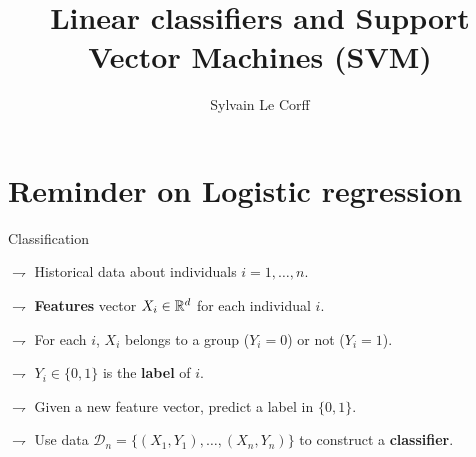 \documentclass[xcolor={usenames,dvipsnames}]{beamer}
\begin{document}
\title[]{Linear classifiers and Support Vector Machines (SVM)}
\author[S.~Le Corff]{Sylvain Le Corff}
\date{}

\begin{frame}[plain]
\titlepage
\end{frame}

\begin{frame}{}
\setcounter{tocdepth}{1}
\tableofcontents
\end{frame}





\section{Reminder on Logistic regression}

\begin{frame}{Classification}


$\rightharpoondown$ Historical data  about \alert{individuals $i=1, \ldots, n$}.

\vspace{.1cm}

$\rightharpoondown$ \textbf{Features} vector $X_i \in \mathbb{R}^d$ for each individual $i$.

\vspace{.1cm}

$\rightharpoondown$ For each $i$, $X_i$ \alert{belongs to a group} ($Y_i = 0$) or not ($Y_i = 1$).

\vspace{.1cm}

$\rightharpoondown$ $Y_i \in \{ 0, 1 \}$ is  the \textbf{label} of $i$.


\vspace{.6cm}


$\rightharpoondown$ Given a new feature vector, \alert{predict a label in $\{ 0, 1 \}$}.

\vspace{.2cm}

$\rightharpoondown$ Use data $\mathcal{D}_n = \{ (X_1, Y_1), \ldots, (X_n, Y_n) \}$ \alert{to construct a  \textbf{classifier}}.

\end{frame}
\end{document}
